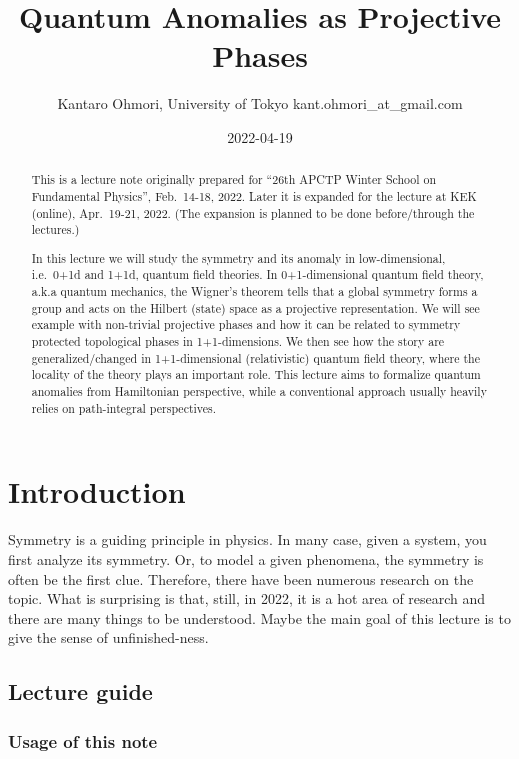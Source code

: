 \documentclass[
]{scrartcl}
\title{Quantum Anomalies as Projective Phases}
\author{Kantaro Ohmori, University of Tokyo kant.ohmori\_at\_gmail.com}
\date{2022-04-19}
\numberwithin{equation}{section}
\theoremstyle{definition}
\theoremstyle{definition}
\theoremstyle{definition}
\theoremstyle{definition}
\theoremstyle{remark}
\begin{document}
\maketitle
\begin{abstract}
This is a lecture note originally prepared for ``26th APCTP Winter School on Fundamental Physics'', Feb.~14-18, 2022.
Later it is expanded for the lecture at KEK (online), Apr.~19-21, 2022.
(The expansion is planned to be done before/through the lectures.)

In this lecture we will study the symmetry and its anomaly in low-dimensional, i.e.~0+1d and 1+1d, quantum field theories.
In 0+1-dimensional quantum field theory, a.k.a quantum mechanics, the Wigner's theorem tells that a global symmetry forms a group and acts on the Hilbert (state) space as a projective representation. We will see example with non-trivial projective phases and how it can be related to symmetry protected topological phases in 1+1-dimensions. We then see how the story are generalized/changed in 1+1-dimensional (relativistic) quantum field theory, where the locality of the theory plays an important role.
This lecture aims to formalize quantum anomalies from Hamiltonian perspective, while a conventional approach usually heavily relies on path-integral perspectives.
\end{abstract}

{
\setcounter{tocdepth}{2}
\tableofcontents
}
\hypertarget{introduction}{%
\section{Introduction}\label{introduction}}

Symmetry is a guiding principle in physics. In many case, given a system, you first analyze its symmetry. Or, to model a given phenomena, the symmetry is often be the first clue.
Therefore, there have been numerous research on the topic. What is surprising is that, still, in 2022, it is a hot area of research and there are many things to be understood.
Maybe the main goal of this lecture is to give the sense of unfinished-ness.

\hypertarget{lecture-guide}{%
\subsection{Lecture guide}\label{lecture-guide}}

\hypertarget{usage-of-this-note}{%
\subsubsection{Usage of this note}\label{usage-of-this-note}}
\end{document}
